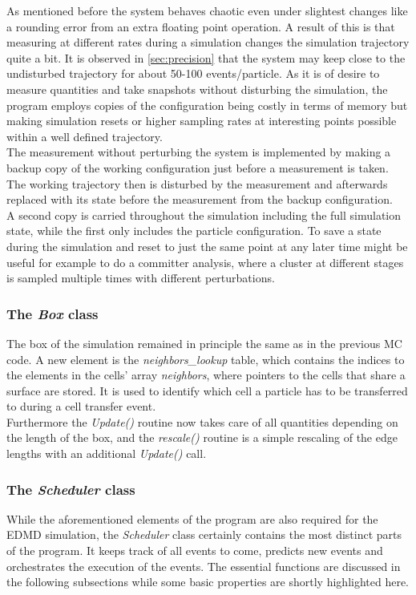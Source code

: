 As mentioned before the system behaves chaotic even under slightest changes like a rounding error from an extra floating point operation. A result of this is that measuring at different rates during a simulation changes the simulation trajectory quite a bit. It is observed in \autoref{sec:precision} that the system may keep close to the undisturbed trajectory for about 50-100 events/particle. As it is of desire to measure quantities and take snapshots without disturbing the simulation, the program employs copies of the configuration being costly in terms of memory but making simulation resets or higher sampling rates at interesting points possible within a well defined trajectory.\\ 

The measurement without perturbing the system is implemented by making a backup copy of the working configuration just before a measurement is taken. The working trajectory then is disturbed by the measurement and afterwards replaced with its state before the measurement from the backup configuration.\\
A second copy is carried throughout the simulation including the full simulation state, while the first only includes the particle configuration. To save a state during the simulation and reset to just the same point at any later time might be useful for example to do a committer analysis, where a cluster at different stages is sampled multiple times with different perturbations.

\subsubsection{The \textit{Box} class}
\label{sec:box_class}
The box of the simulation remained in principle the same as in the previous MC code. A new element is the \textit{neighbors\_lookup} table, which contains the indices to the elements in the cells' array \textit{neighbors}, where pointers to the cells that share a surface are stored. It is used to identify which cell a particle has to be transferred to during a cell transfer event.\\

Furthermore the \textit{Update()} routine now takes care of all quantities depending on the length of the box, and the \textit{rescale()} routine is a simple rescaling of the edge lengths with an additional \textit{Update()} call.

\subsubsection{The \textit{Scheduler} class}
\label{sec:scheduler_class}
While the aforementioned elements of the program are also required for the EDMD simulation, the \textit{Scheduler} class certainly contains the most distinct parts of the program. It keeps track of all events to come, predicts new events and orchestrates the execution of the events. The essential functions are discussed in the following subsections while some basic properties are shortly highlighted here.\\

